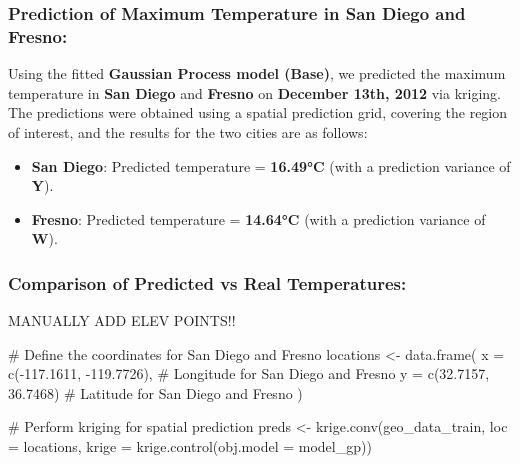 \documentclass[
  11pt,
]{article}
\newenvironment{Shaded}{\begin{snugshade}}{\end{snugshade}}
\newcommand{\AttributeTok}[1]{\textcolor[rgb]{0.40,0.45,0.13}{#1}}
\newcommand{\CommentTok}[1]{\textcolor[rgb]{0.37,0.37,0.37}{#1}}
\newcommand{\FloatTok}[1]{\textcolor[rgb]{0.68,0.00,0.00}{#1}}
\newcommand{\FunctionTok}[1]{\textcolor[rgb]{0.28,0.35,0.67}{#1}}
\newcommand{\NormalTok}[1]{\textcolor[rgb]{0.00,0.23,0.31}{#1}}
\newcommand{\OtherTok}[1]{\textcolor[rgb]{0.00,0.23,0.31}{#1}}
\newcommand{\SpecialCharTok}[1]{\textcolor[rgb]{0.37,0.37,0.37}{#1}}
\begin{document}
\subsubsection{Prediction of Maximum Temperature in San Diego and
Fresno:}\label{prediction-of-maximum-temperature-in-san-diego-and-fresno}

Using the fitted \textbf{Gaussian Process model (Base)}, we predicted
the maximum temperature in \textbf{San Diego} and \textbf{Fresno} on
\textbf{December 13th, 2012} via kriging. The predictions were obtained
using a spatial prediction grid, covering the region of interest, and
the results for the two cities are as follows:

\begin{itemize}
\item
  \textbf{San Diego}: Predicted temperature = \textbf{16.49°C} (with a
  prediction variance of \textbf{Y}).
\item
  \textbf{Fresno}: Predicted temperature = \textbf{14.64°C} (with a
  prediction variance of \textbf{W}).
\end{itemize}

\subsubsection{Comparison of Predicted vs Real
Temperatures:}\label{comparison-of-predicted-vs-real-temperatures}

MANUALLY ADD ELEV POINTS!!

\begin{Shaded}
\begin{Highlighting}[]
\CommentTok{\# Define the coordinates for San Diego and Fresno}
\NormalTok{locations }\OtherTok{\textless{}{-}} \FunctionTok{data.frame}\NormalTok{(}
  \AttributeTok{x =} \FunctionTok{c}\NormalTok{(}\SpecialCharTok{{-}}\FloatTok{117.1611}\NormalTok{, }\SpecialCharTok{{-}}\FloatTok{119.7726}\NormalTok{),  }\CommentTok{\# Longitude for San Diego and Fresno}
  \AttributeTok{y =} \FunctionTok{c}\NormalTok{(}\FloatTok{32.7157}\NormalTok{, }\FloatTok{36.7468}\NormalTok{)       }\CommentTok{\# Latitude for San Diego and Fresno}
\NormalTok{)}

\CommentTok{\# Perform kriging for spatial prediction}
\NormalTok{preds }\OtherTok{\textless{}{-}} \FunctionTok{krige.conv}\NormalTok{(geo\_data\_train, }\AttributeTok{loc =}\NormalTok{ locations, }\AttributeTok{krige =} \FunctionTok{krige.control}\NormalTok{(}\AttributeTok{obj.model =}\NormalTok{ model\_gp))}
\end{Highlighting}
\end{Shaded}
\end{document}
